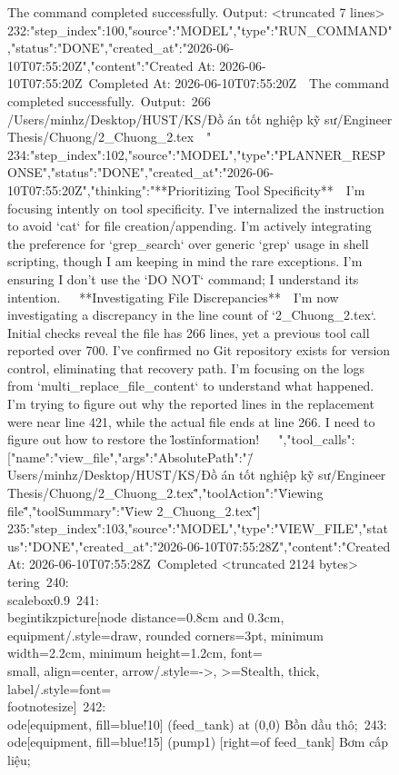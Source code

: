 \begin{figure}[htbp]
{				The command completed successfully.
				Output:
				<truncated 7 lines>
232:{"step_index":100,"source":"MODEL","type":"RUN_COMMAND","status":"DONE","created_at":"2026-06-10T07:55:20Z","content":"Created At: 2026-06-10T07:55:20Z\
Completed At: 2026-06-10T07:55:20Z\
\
				The command completed successfully.\
				Output:\
				     266 /Users/minhz/Desktop/HUST/KS/Đồ án tốt nghiệp kỹ sư/Engineer Thesis/Chuong/2_Chuong_2.tex\
\
"}
234:{"step_index":102,"source":"MODEL","type":"PLANNER_RESPONSE","status":"DONE","created_at":"2026-06-10T07:55:20Z","thinking":"**Prioritizing Tool Specificity**\
\
I'm focusing intently on tool specificity. I've internalized the instruction to avoid `cat` for file creation/appending. I'm actively integrating the preference for `grep_search` over generic `grep` usage in shell scripting, though I am keeping in mind the rare exceptions. I'm ensuring I don't use the `DO NOT` command; I understand its intention.\
\
\
**Investigating File Discrepancies**\
\
I'm now investigating a discrepancy in the line count of `2_Chuong_2.tex`. Initial checks reveal the file has 266 lines, yet a previous tool call reported over 700. I've confirmed no Git repository exists for version control, eliminating that recovery path. I'm focusing on the logs from `multi_replace_file_content` to understand what happened. I'm trying to figure out why the reported lines in the replacement were near line 421, while the actual file ends at line 266. I need to figure out how to restore the \"lost\" information!\
\
\
","tool_calls":[{"name":"view_file","args":{"AbsolutePath":"\"/Users/minhz/Desktop/HUST/KS/Đồ án tốt nghiệp kỹ sư/Engineer Thesis/Chuong/2_Chuong_2.tex\"","toolAction":"\"Viewing file\"","toolSummary":"\"View 2_Chuong_2.tex\""}}]}
235:{"step_index":103,"source":"MODEL","type":"VIEW_FILE","status":"DONE","created_at":"2026-06-10T07:55:28Z","content":"Created At: 2026-06-10T07:55:28Z\
Completed
<truncated 2124 bytes>
tering\
240: \\scalebox{0.9}{\
241: \\begin{tikzpicture}[node distance=0.8cm and 0.3cm, equipment/.style={draw, rounded corners=3pt, minimum width=2.2cm, minimum height=1.2cm, font=\\small, align=center}, arrow/.style={->, >=Stealth, thick}, label/.style={font=\\footnotesize}]\
242: \\
ode[equipment, fill=blue!10] (feed_tank) at (0,0) {Bồn dầu thô};\
243: \\
ode[equipment, fill=blue!15] (pump1) [right=of feed_tank] {Bơm cấp liệu};\
}}}
\end{figure}
